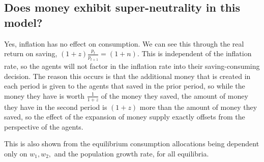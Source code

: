 \documentclass[11pt]{article} %
\begin{document}
\subsection{Does money exhibit super-neutrality in this model?}

Yes, inflation has no effect on consumption. We can see this through the real return on saving, $(1+z)\frac{p_t}{p_{t+1}} = (1+n)$. This is independent of the inflation rate, so the agents will not factor in the inflation rate into their saving-consuming decision. The reason this occurs is that the additional money that is created in each period is given to the agents that saved in the prior period, so while the money they have is worth $\frac{1}{1+z}$ of the money they saved, the amount of money they have in the second period is $(1+z)$ more than the amount of money they saved, so the effect of the expansion of money supply exactly offsets from the perspective of the agents. 

This is also shown from the equilibrium consumption allocations being dependent only on $w_1,w_2,$ and the population growth rate, for all equilibria.
\end{document}

